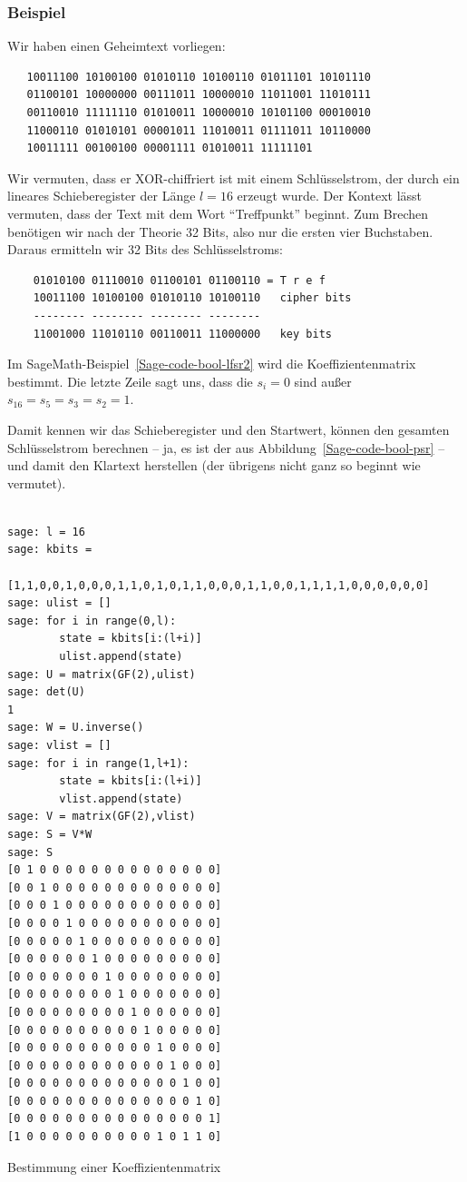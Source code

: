 \begin{refsegment}
\subsubsection*{Beispiel}

Wir haben einen Geheimtext vorliegen:
\begin{verbatim}
   10011100 10100100 01010110 10100110 01011101 10101110
   01100101 10000000 00111011 10000010 11011001 11010111
   00110010 11111110 01010011 10000010 10101100 00010010
   11000110 01010101 00001011 11010011 01111011 10110000
   10011111 00100100 00001111 01010011 11111101
\end{verbatim}
Wir vermuten, dass er XOR-chiffriert
ist mit einem Schlüsselstrom, der
durch ein lineares Schieberegister der Länge $l = 16$ erzeugt wurde.
Der Kontext lässt vermuten, dass der Text mit dem Wort "`Treffpunkt"'
beginnt. Zum Brechen benötigen wir nach der Theorie 32 Bits, also
nur die ersten vier Buchstaben. Daraus ermitteln wir 32 Bits des
Schlüsselstroms:
\begin{verbatim}
    01010100 01110010 01100101 01100110 = T r e f
    10011100 10100100 01010110 10100110   cipher bits
    -------- -------- -------- --------
    11001000 11010110 00110011 11000000   key bits
\end{verbatim}
Im SageMath-Beispiel~\ref{Sage-code-bool-lfsr2} wird die Koeffizientenmatrix
bestimmt. Die letzte Zeile sagt uns, dass die $s_i = 0$ sind außer
$s_{16} = s_5 = s_3 = s_2 = 1$.

Damit kennen wir das Schieberegister und den Startwert, können den
gesamten Schlüsselstrom berechnen -- ja, es ist der aus Abbildung~\ref{Sage-code-bool-psr}
-- und damit den Klartext herstellen
(der übrigens nicht ganz so beginnt wie vermutet).

\begin{sagecode}
\begin{verbatim}

sage: l = 16
sage: kbits =
      [1,1,0,0,1,0,0,0,1,1,0,1,0,1,1,0,0,0,1,1,0,0,1,1,1,1,0,0,0,0,0,0]
sage: ulist = []
sage: for i in range(0,l):
        state = kbits[i:(l+i)]
        ulist.append(state)
sage: U = matrix(GF(2),ulist)
sage: det(U)
1
sage: W = U.inverse()
sage: vlist = []
sage: for i in range(1,l+1):
        state = kbits[i:(l+i)]
        vlist.append(state)
sage: V = matrix(GF(2),vlist)
sage: S = V*W
sage: S
[0 1 0 0 0 0 0 0 0 0 0 0 0 0 0 0]
[0 0 1 0 0 0 0 0 0 0 0 0 0 0 0 0]
[0 0 0 1 0 0 0 0 0 0 0 0 0 0 0 0]
[0 0 0 0 1 0 0 0 0 0 0 0 0 0 0 0]
[0 0 0 0 0 1 0 0 0 0 0 0 0 0 0 0]
[0 0 0 0 0 0 1 0 0 0 0 0 0 0 0 0]
[0 0 0 0 0 0 0 1 0 0 0 0 0 0 0 0]
[0 0 0 0 0 0 0 0 1 0 0 0 0 0 0 0]
[0 0 0 0 0 0 0 0 0 1 0 0 0 0 0 0]
[0 0 0 0 0 0 0 0 0 0 1 0 0 0 0 0]
[0 0 0 0 0 0 0 0 0 0 0 1 0 0 0 0]
[0 0 0 0 0 0 0 0 0 0 0 0 1 0 0 0]
[0 0 0 0 0 0 0 0 0 0 0 0 0 1 0 0]
[0 0 0 0 0 0 0 0 0 0 0 0 0 0 1 0]
[0 0 0 0 0 0 0 0 0 0 0 0 0 0 0 1]
[1 0 0 0 0 0 0 0 0 0 0 1 0 1 1 0]
\end{verbatim}
\caption{Bestimmung einer Koeffizientenmatrix}\label{Sage-code-bool-lfsr2}
\end{sagecode}


\end{refsegment}
